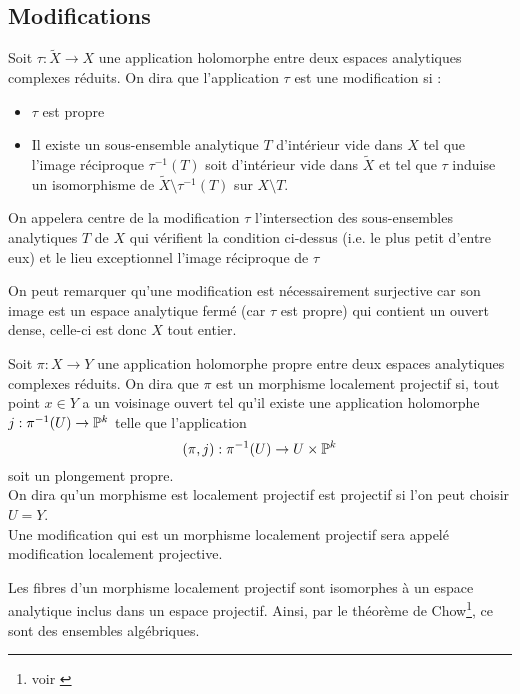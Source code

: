 \documentclass[a4page,10pt]{article}
\begin{document}
\subsection{Modifications}
\begin{Def}
  Soit $\tau : \widetilde{X} \to X$ une application holomorphe entre deux espaces analytiques complexes r\'eduits. On dira que l'application $\tau$ est une modification si :
  \begin{itemize}
  \item $\tau$ est propre
    \item Il existe un sous-ensemble analytique $T$ d'int\'erieur vide dans $X$ tel que l'image r\'eciproque $\tau^{-1}(T)$ soit d'int\'erieur vide dans $\widetilde{X}$ et tel que $\tau$ induise un isomorphisme de $\widetilde{X}\setminus \tau^{-1}(T)$ sur $X \setminus T$. 
    \end{itemize}
On appelera centre de la modification $\tau$ l'intersection des sous-ensembles analytiques $T$ de $X$ qui v\'erifient la condition ci-dessus (i.e. le plus petit d'entre eux) et le lieu exceptionnel l'image r\'eciproque de $\tau$  
\end{Def}

On peut remarquer qu'une modification est n\'ecessairement surjective car son image est un espace analytique ferm\'e (car $\tau$ est propre) qui contient un ouvert dense, celle-ci est donc $X$ tout entier.

\begin{Def}
  Soit $\pi : X \to Y$ une application holomorphe propre entre deux espaces analytiques complexes r\'eduits. On dira que $\pi$ est un morphisme localement projectif si, tout point $x \in Y$ a un voisinage ouvert tel qu'il existe une application holomorphe $j : \pi^{-1}(U) \to \P^k$ telle que l'application 
		\[(\pi,j) : \pi^{-1}(U) \to U \times \P^k
	\]
	 soit un plongement propre. \\
 On dira qu'un morphisme est localement projectif est projectif si l'on peut choisir $U=Y$. \\
  Une modification qui est un morphisme localement projectif sera appel\'e modification localement projective.
\end{Def}
\begin{Rq}
Les fibres d'un morphisme localement projectif sont isomorphes \`a un espace analytique inclus dans un espace projectif. Ainsi, par le th\'eor\`eme de Chow\footnote{voir \cite{}}, ce sont des ensembles alg\'ebriques. 
\end{Rq}
\end{document}
